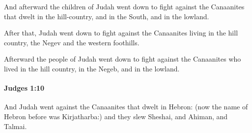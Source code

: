 			\begin{versebox}
					\item[BHS] 
					\item[ASV] And afterward the children of Judah went down to fight against the Canaanites that dwelt in the hill-country, and in the South, and in the lowland.
					\item[NIV] After that, Judah went down to fight against the Canaanites living in the hill country, the Negev and the western foothills.
					\item[NRSV] Afterward the people of Judah went down to fight against the Canaanites who lived in the hill country, in the Negeb, and in the lowland.
			\end{versebox}

		\paragraph{Judges 1:10} %
			\label{JUDGES-1-10}

			And Judah went against the Canaanites that dwelt in Hebron: (now the name of Hebron before was Kirjatharba:) and they slew Sheshai, and Ahiman, and Talmai.

